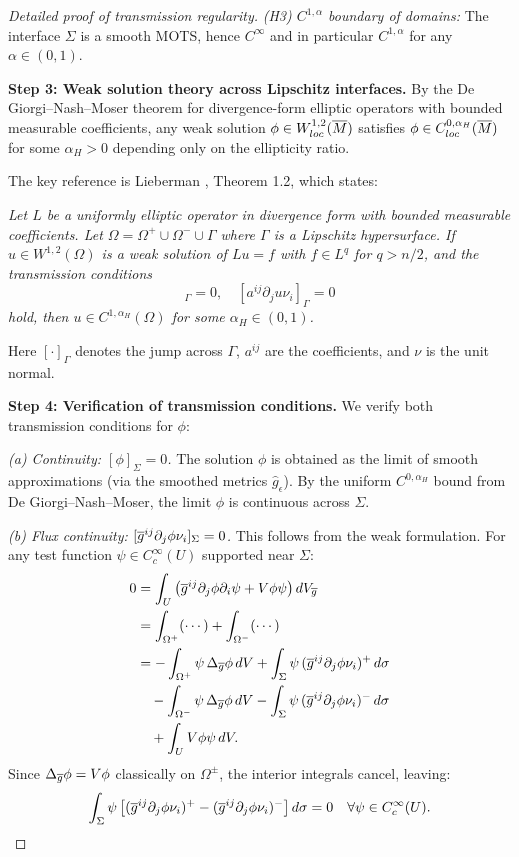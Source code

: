 \begin{proof}[Detailed proof of transmission regularity]
\textit{(H3) $C^{1,\alpha}$ boundary of domains:} The interface $\Sigma$ is a smooth MOTS, hence $C^\infty$ and in particular $C^{1,\alpha}$ for any $\alpha \in (0,1)$.

\textbf{Step 3: Weak solution theory across Lipschitz interfaces.}
By the De Giorgi--Nash--Moser theorem for divergence-form elliptic operators with bounded measurable coefficients, any weak solution $\phi \in W^{1,2}_{loc}(\overline{M})$ satisfies $\phi \in C^{0,\alpha_H}_{loc}(\overline{M})$ for some $\alpha_H > 0$ depending only on the ellipticity ratio.

The key reference is Lieberman \cite{lieberman1988}, Theorem 1.2, which states:

\textit{Let $L$ be a uniformly elliptic operator in divergence form with bounded measurable coefficients. Let $\Omega = \Omega^+ \cup \Omega^- \cup \Gamma$ where $\Gamma$ is a Lipschitz hypersurface. If $u \in W^{1,2}(\Omega)$ is a weak solution of $Lu = f$ with $f \in L^q$ for $q > n/2$, and the transmission conditions
\begin{equation}
    [u]_\Gamma = 0, \quad [a^{ij} \partial_j u \nu_i]_\Gamma = 0
\end{equation}
hold, then $u \in C^{1,\alpha_H}(\Omega)$ for some $\alpha_H \in (0,1)$.}

Here $[\cdot]_\Gamma$ denotes the jump across $\Gamma$, $a^{ij}$ are the coefficients, and $\nu$ is the unit normal.

\textbf{Step 4: Verification of transmission conditions.}
We verify both transmission conditions for $\phi$:

\textit{(a) Continuity: $[\phi]_\Sigma = 0$.}
The solution $\phi$ is obtained as the limit of smooth approximations (via the smoothed metrics $\hat{g}_\epsilon$). By the uniform $C^{0,\alpha_H}$ bound from De Giorgi--Nash--Moser, the limit $\phi$ is continuous across $\Sigma$.

\textit{(b) Flux continuity: $[\overline{g}^{ij} \partial_j \phi \nu_i]_\Sigma = 0$.}
This follows from the weak formulation. For any test function $\psi \in C^\infty_c(U)$ supported near $\Sigma$:
\begin{align}
    0 &= \int_U \left( \overline{g}^{ij} \partial_j \phi \partial_i \psi + V \phi \psi \right) dV_{\overline{g}} \\
    &= \int_{\Omega^+} (\cdots) + \int_{\Omega^-} (\cdots) \\
    &= -\int_{\Omega^+} \psi \, \Delta_{\overline{g}} \phi \, dV + \int_\Sigma \psi \, (\overline{g}^{ij} \partial_j \phi \nu_i)^+ \, d\sigma \\
    &\quad - \int_{\Omega^-} \psi \, \Delta_{\overline{g}} \phi \, dV - \int_\Sigma \psi \, (\overline{g}^{ij} \partial_j \phi \nu_i)^- \, d\sigma \\
    &\quad + \int_U V \phi \psi \, dV.
\end{align}
Since $\Delta_{\overline{g}} \phi = V \phi$ classically on $\Omega^\pm$, the interior integrals cancel, leaving:
\begin{equation}
    \int_\Sigma \psi \left[ (\overline{g}^{ij} \partial_j \phi \nu_i)^+ - (\overline{g}^{ij} \partial_j \phi \nu_i)^- \right] d\sigma = 0 \quad \forall \psi \in C^\infty_c(U).
\end{equation}


\end{proof}
